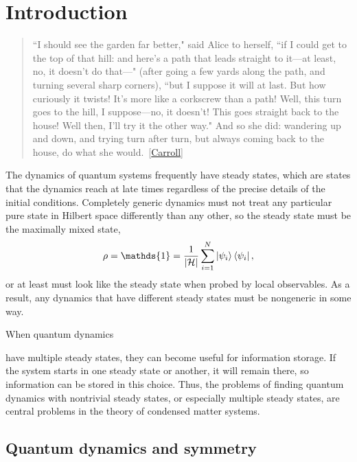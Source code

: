 
\chapter{Introduction}
\label{chp:intro}

\begin{quotation}
	 ``I should see the garden far better," said Alice to herself, ``if I could get to the top of that hill: and here’s a path that leads straight to it—at least, no, it doesn’t do that—" (after going a few yards along the path, and turning several sharp corners), ``but I suppose it will at last. But how curiously it twists! It's more like a corkscrew than a path! Well, this turn goes to the hill, I suppose—no, it doesn't! This goes straight back to the house! Well then, I’ll try it the other way."
	And so she did: wandering up and down, and trying turn after turn, but always coming back to the house, do what she would.~[\hyperlink{cite.\therefsection @Carroll2002Alice}{Carroll}]
\end{quotation}

The dynamics of quantum systems frequently have steady states, which are states that the dynamics reach at late times regardless of the precise details of the initial conditions. Completely generic dynamics must not treat any particular pure state in Hilbert space differently than any other, so the steady state must be the maximally mixed state,
\begin{align}
\rho = \mathds{1} = \frac{1}{|\mathcal{H}|} \sum_{i=1}^N \ket{\psi_i} \bra{\psi_i},
\end{align}
or at least must look like the steady state when probed by local observables.
As a result, any dynamics that have different steady states must be nongeneric in some way. 

\hypertarget{thesentence}{When quantum dynamics} have multiple steady states, they can become useful for information storage. If the system starts in one steady state or another, it will remain there, so information can be stored in this choice. Thus, the problems of finding quantum dynamics with nontrivial steady states, or especially multiple steady states, are central problems in the theory of condensed matter systems.

\section{Quantum dynamics and symmetry}


